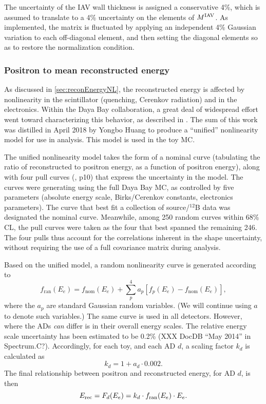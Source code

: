 \documentclass[../thesis.tex]{subfiles}
\begin{document}
The uncertainty of the IAV wall thickness is assigned a conservative 4\%, which is assumed to translate to a 4\% uncertainty on the elements of $M^{\mathrm{IAV}}$. As implemented, the matrix is fluctuated by applying an independent 4\% Gaussian variation to each off-diagonal element, and then setting the diagonal elements so as to restore the normalization condition.

\subsubsection{Positron to mean reconstructed energy}

As discussed in \autoref{sec:reconEnergyNL}, the reconstructed energy is affected by nonlinearity in the scintillator (quenching, Cerenkov radiation) and in the electronics. Within the Daya Bay collaboration, a great deal of widespread effort went toward characterizing this behavior, as described in \cite{NonlinearityPaper}. The sum of this work was distilled in April 2018 by Yongbo Huang \cite{EnergyModelUpdateYongbo} to produce a ``unified'' nonlinearity model for use in analysis. This model is used in the toy MC.

The unified nonlinearity model takes the form of a nominal curve (tabulating the ratio of reconstructed to positron energy, as a function of positron energy), along with four pull curves (\cite{EnergyModelUpdateSoeren}, p10) that express the uncertainty in the model. The curves were generating using the full Daya Bay MC, as controlled by five parameters (absolute energy scale, Birks/Cerenkov constants, electronics parameters). The curve that best fit a collection of source/$^{12}$B data was designated the nominal curve. Meanwhile, among 250 random curves within 68\% CL, the pull curves were taken as the four that best spanned the remaining 246. The four pulls thus account for the correlations inherent in the shape uncertainty, without requiring the use of a full covariance matrix during analysis.

Based on the unified model, a random nonlinearity curve is generated according to
\begin{equation}
  \label{eq:fitRandomNL}
  f_{\mathrm{ran}}(E_e) = f_{\mathrm{nom}}(E_e) + \sum_p^4 a_p [ f_p(E_e) - f_{\mathrm{nom}}(E_e)],
\end{equation}
where the $a_p$ are standard Gaussian random variables. (We will continue using $a$ to denote such variables.) The same curve is used in all detectors. However, where the ADs \textit{can} differ is in their overall energy scales. The relative energy scale uncertainty has been estimated to be 0.2\% (XXX DocDB ``May 2014'' in Spectrum.C?). Accordingly, for each toy, and each AD $d$, a scaling factor $k_d$ is calculated as
\begin{equation*}
  k_d = 1 + a_d \cdot 0.002.
\end{equation*}
The final relationship between positron and reconstructed energy, for AD $d$, is then
\begin{equation*}
  E_\mathrm{rec} = F_d(E_e) = k_d \cdot f_{\mathrm{ran}}(E_e) \cdot E_e.
\end{equation*}
\end{document}
